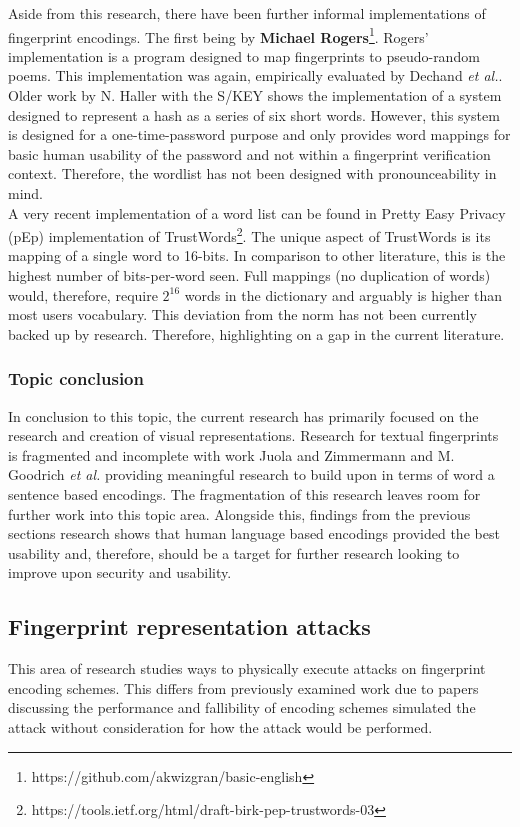 Aside from this research, there have been further informal implementations of fingerprint encodings. The first being by \textbf{Michael Rogers}\footnote{https://github.com/akwizgran/basic-english}. Rogers' implementation is a program designed to map fingerprints to pseudo-random poems. This implementation was again, empirically evaluated by Dechand \textit{et al.}\cite{dechand2016empirical}. Older work by N. Haller with the S/KEY\cite{haller1995s} shows the implementation of a system designed to represent a hash as a series of six short words. However, this system is designed for a one-time-password purpose and only provides word mappings for basic human usability of the password and not within a fingerprint verification context. Therefore, the wordlist has not been designed with pronounceability in mind.
\\
A very recent implementation of a word list can be found in Pretty Easy Privacy (pEp) implementation of TrustWords\footnote{https://tools.ietf.org/html/draft-birk-pep-trustwords-03}. The unique aspect of TrustWords is its mapping of a single word to 16-bits. In comparison to other literature, this is the highest number of bits-per-word seen. Full mappings (no duplication of words) would, therefore, require $2^{16}$ words in the dictionary and arguably is higher than most users vocabulary. This deviation from the norm has not been currently backed up by research. Therefore, highlighting on a gap in the current literature.

\subsubsection{Topic conclusion}

In conclusion to this topic, the current research has primarily focused on the research and creation of visual representations. Research for textual fingerprints is fragmented and incomplete with work Juola and Zimmermann 
\cite{juola1996whole} and M. Goodrich \textit{et al.}\cite{goodrich2006loud} providing meaningful research to build upon in terms of word a sentence based encodings. The fragmentation of this research leaves room for further work into this topic area. Alongside this, findings from the previous sections research shows that human language based encodings provided the best usability and, therefore, should be a target for further research looking to improve upon security and usability.

\subsection{Fingerprint representation attacks}
This area of research studies ways to physically execute attacks on fingerprint encoding schemes. This differs from previously examined work due to papers discussing the performance and fallibility of encoding schemes simulated the attack without consideration for how the attack would be performed.

